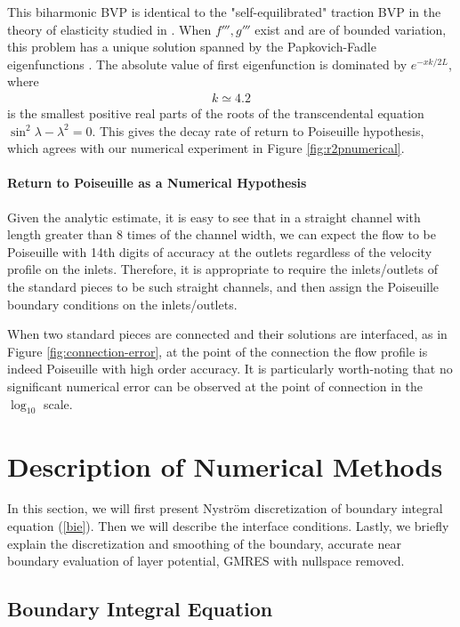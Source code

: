 \documentclass[10pt,twocolumn]{article}
\begin{document}
This biharmonic BVP is identical to the "self-equilibrated" traction BVP in the theory of elasticity studied in
\cite{gregoryTractionBoundaryValue1980,horganDECAYESTIMATESBIHARMONIC1989,coRecentDevelopmentsConcerning1983}. 
When $f''',g'''$ exist and are of bounded variation, 
this problem has a unique solution spanned by the Papkovich-Fadle eigenfunctions \cite{gregoryTractionBoundaryValue1980}.
The absolute value of first eigenfunction is dominated by $e^{-xk/2L}$, where 
\begin{align*}
  k \simeq 4.2 
\end{align*}
is the smallest positive real parts of the roots 
of the transcendental equation $\sin^2\lambda - \lambda^2=0$. 
This gives the decay rate of return to Poiseuille hypothesis, 
which agrees with our numerical experiment in Figure \ref{fig:r2pnumerical}. 

\paragraph{Return to Poiseuille as a Numerical Hypothesis}
Given the analytic estimate, it is easy to see
that in a straight channel with length greater than 8 times of the channel width, we can expect the 
flow to be Poiseuille with 14th digits of accuracy at the outlets regardless of the velocity profile on the inlets. Therefore, it is appropriate to require the inlets/outlets of
the standard pieces to be such straight channels, 
and then assign the Poiseuille boundary conditions on the inlets/outlets. 

When two standard pieces are connected and their solutions are interfaced, 
as in Figure \ref{fig:connection-error}, at the point of the connection the flow profile is indeed Poiseuille with high order accuracy. It is particularly worth-noting that no significant numerical error can be observed at the point of connection in the $\log_{10}$ scale. 

\section{Description of Numerical Methods\label{sec:numericalmethod}}
In this section, we will first present Nystr\"om discretization of boundary integral equation (\ref{bie}). Then we will describe the interface conditions. Lastly, we briefly explain the discretization and smoothing of the boundary, accurate near boundary evaluation of layer potential, GMRES with nullspace removed. 

\subsection{Boundary Integral Equation}
\end{document}
